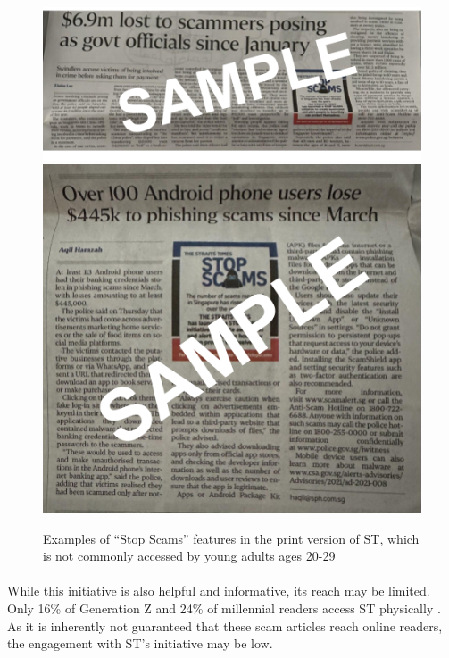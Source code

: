 \message{ !name(written-report.tex)}\documentclass[a4paper]{article}
\begin{document}
\begin{figure}[ht!]
   \centering
  \includegraphics[width=\textwidth]{stopscams1} \endminipage\hfill
   \centering
  \includegraphics[width=\textwidth]{stopscams2} \endminipage{}
  \caption{Examples of “Stop Scams” features in the print version of ST, which
    is not commonly accessed by young adults ages 20-29}\label{fig:stopcams}
\end{figure}

\paragraph{} While this initiative is also helpful and informative, its reach
may be limited. Only 16\% of Generation Z and 24\% of millennial readers access
ST physically \parencite{Ho.2021}. As it is inherently not guaranteed that these
scam articles reach online readers, the engagement with ST’s initiative may be
low.
\end{document}
